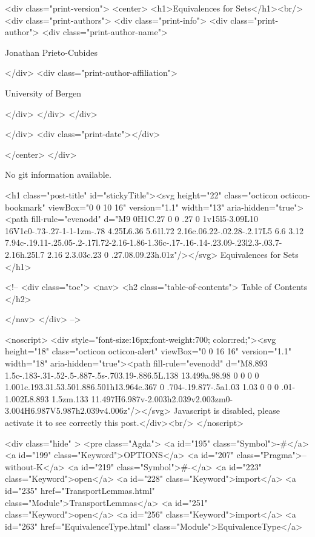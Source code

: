   <div class="print-version">
    <center>
      <h1>Equivalences for Sets</h1><br/>
        <div class="print-authors">
          <div class="print-info">
            <div class="print-author">
              <div class="print-author-name">
                
                  Jonathan Prieto-Cubides
                
              </div>
              <div class="print-author-affiliation">
                
                  University of Bergen
                
                </div>
            </div>
          </div>
          
          
        </div>
        <div class="print-date"></div>
        
        
    </center>
  </div>

  
  No git information available.
  
  <h1 class="post-title" id="stickyTitle"><svg height="22" class="octicon octicon-bookmark" viewBox="0 0 10 16" version="1.1" width="13" aria-hidden="true"><path fill-rule="evenodd" d="M9 0H1C.27 0 0 .27 0 1v15l5-3.09L10 16V1c0-.73-.27-1-1-1zm-.78 4.25L6.36 5.61l.72 2.16c.06.22-.02.28-.2.17L5 6.6 3.12 7.94c-.19.11-.25.05-.2-.17l.72-2.16-1.86-1.36c-.17-.16-.14-.23.09-.23l2.3-.03.7-2.16h.25l.7 2.16 2.3.03c.23 0 .27.08.09.23h.01z"/></svg> Equivalences for Sets
  </h1>

  <!-- 
  <div class="toc">
    <nav>
    <h2 class="table-of-contents"> Table of Contents </h2>
      

    </nav>
  </div>
   -->

  <noscript>
  <div style="font-size:16px;font-weight:700; color:red;"><svg height="18" class="octicon octicon-alert" viewBox="0 0 16 16" version="1.1" width="18" aria-hidden="true"><path fill-rule="evenodd" d="M8.893 1.5c-.183-.31-.52-.5-.887-.5s-.703.19-.886.5L.138 13.499a.98.98 0 0 0 0 1.001c.193.31.53.501.886.501h13.964c.367 0 .704-.19.877-.5a1.03 1.03 0 0 0 .01-1.002L8.893 1.5zm.133 11.497H6.987v-2.003h2.039v2.003zm0-3.004H6.987V5.987h2.039v4.006z"/></svg> Javascript is disabled, please activate it to see correctly this post.</div><br/>
  </noscript>

  <div class="hide" >
<pre class="Agda">
<a id="195" class="Symbol">{-#</a> <a id="199" class="Keyword">OPTIONS</a> <a id="207" class="Pragma">--without-K</a> <a id="219" class="Symbol">#-}</a>
<a id="223" class="Keyword">open</a> <a id="228" class="Keyword">import</a> <a id="235" href="TransportLemmas.html" class="Module">TransportLemmas</a>
<a id="251" class="Keyword">open</a> <a id="256" class="Keyword">import</a> <a id="263" href="EquivalenceType.html" class="Module">EquivalenceType</a>

